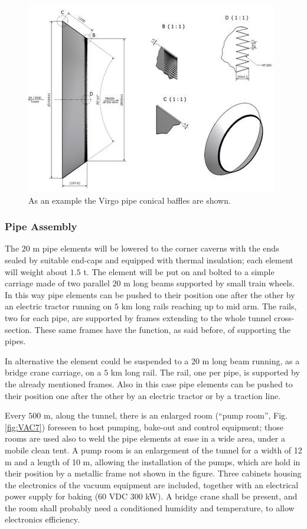 \begin{figure}
\begin{center}
\includegraphics{Sec_SiteInfra/Figures/VAC5.jpg}
\caption{As an example the Virgo pipe conical baffles are shown.}
\label{fig:vac5}
\end{center}
\end{figure}


\subsubsection{Pipe Assembly}

The $20$ m pipe elements will be lowered to the corner caverns with the ends sealed by suitable end-caps and equipped with thermal insulation; each element will weight about $1.5$ t. The element will be put on and bolted to a simple carriage made of two parallel $20$ m long beams supported by small train wheels. In this way pipe elements can be pushed to their position one after the other by an electric tractor running on $5$ km long rails reaching up to mid arm. The rails, two for each pipe, are supported by frames extending to the whole tunnel cross-section. These same frames have the function, as said before, of supporting the pipes.

In alternative the element could be suspended to a $20$ m long beam running, as a bridge crane carriage, on a $5$ km long rail. The rail, one per pipe, is supported by the already mentioned frames. Also in this case pipe elements can be pushed to their position one after the other by an electric tractor or by a traction line.

Every $500$ m, along the tunnel, there is an enlarged room (``pump room'', Fig.\ref{fig:VAC7}) foreseen to host pumping, bake-out and control equipment; those rooms are used also to weld the pipe elements at ease in a wide area, under a mobile clean tent. A pump room is an enlargement of the tunnel for a width of 12 m and a length of 10 m, allowing the installation of the pumps, which are hold in their position by a metallic frame not shown in the figure. Three cabinets housing the electronics of the vacuum equipment are included, together with an electrical power supply for baking (60 VDC 300 kW). A bridge crane shall be present, and the room shall probably need a conditioned humidity and temperature, to allow electronics efficiency.

